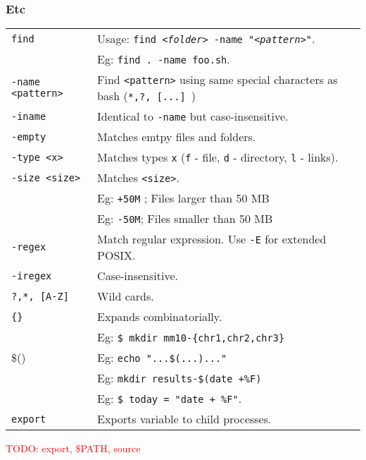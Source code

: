 \subsubsection{Etc}

\begin{tabularx}{\linewidth}{lX}
    \texttt{find}               & Usage: \texttt{find \textit{<folder>} -name "\textit{<pattern>}"}.\\
                                & Eg: \texttt{find . -name foo.sh}.\\
    \texttt{-name <pattern>}    & Find \texttt{<pattern>} using same special characters as bash (\texttt{*,?, [...] })\\
    \texttt{-iname}             & Identical to \texttt{-name} but case-insensitive.\\
    \texttt{-empty}             & Matches emtpy files and folders.\\
    \texttt{-type <x>}          & Matches types \texttt{x} (\texttt{f} - file, \texttt{d} - directory, \texttt{l} - links).\\
    \texttt{-size <size>}       & Matches \texttt{<size>}.\\
                                &  Eg: \texttt{+50M} ; Files larger than 50 MB\\
                                & Eg: \texttt{-50M}; Files smaller than 50 MB\\
    \texttt{-regex}             & Match regular expression. Use \texttt{-E} for extended POSIX.\\
    \texttt{-iregex}            & Case-insensitive.\\
    \hline
    
    \texttt{?,*, [A-Z]} & Wild cards.\\
    \texttt{\{\}} & Expands combinatorially.\\ 
    &  Eg: \texttt{\$ mkdir mm10-\{chr1,chr2,chr3\}}\\
    \$() & Eg: \texttt{echo "...\$(...)..."}\\
    & Eg: \texttt{mkdir results-\$(date +\%F)}\\
    & Eg: \texttt{\$ today = "date + \%F"}. \\
    \hline

    \texttt{export}          &  Exports variable to child processes.\\
\end{tabularx}


\textcolor{red}{TODO: export, \$PATH, source}




\vfill\null
\columnbreak